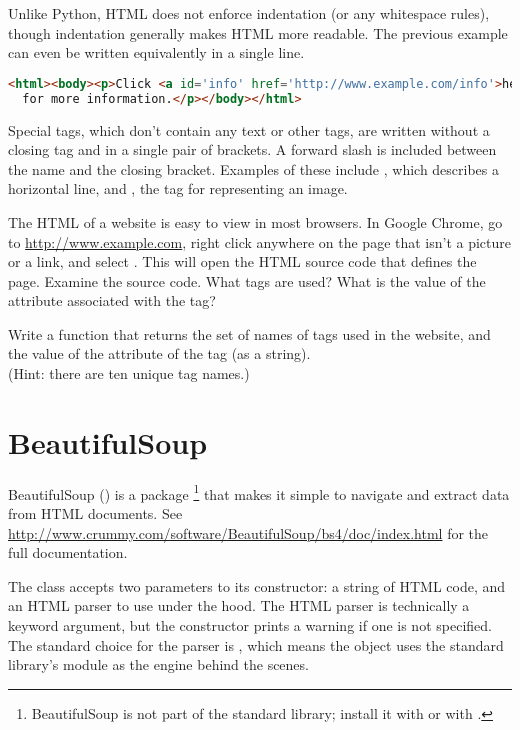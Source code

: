Unlike Python, HTML does not enforce indentation (or any whitespace rules), though indentation generally makes HTML more readable.
The previous example can even be written equivalently in a single line.

\begin{lstlisting}[language=HTML]
<html><body><p>Click <a id='info' href='http://www.example.com/info'>here</a>
  for more information.</p></body></html>
\end{lstlisting}

Special tags, which don't contain any text or other tags, are written without a closing tag and in a single pair of brackets.
A forward slash is included between the name and the closing bracket.
Examples of these include , which describes a horizontal line, and , the tag for representing an image.

\begin{problem} %
The HTML of a website is easy to view in most browsers.
In Google Chrome, go to \url{http://www.example.com}, right click anywhere on the page that isn't a picture or a link, and select .
This will open the HTML source code that defines the page.
Examine the source code.
What tags are used?
What is the value of the  attribute associated with the  tag?

Write a function that returns the set of names of tags used in the website, and the value of the  attribute of the  tag (as a string).
\\(Hint: there are ten unique tag names.)
\label{prob:look-at-example.com}
\end{problem}

\section*{BeautifulSoup} %

BeautifulSoup () is a package%
\footnote{BeautifulSoup is not part of the standard library; install it with  or with .} that makes it simple to navigate and extract data from HTML documents.
See \url{http://www.crummy.com/software/BeautifulSoup/bs4/doc/index.html} for the full documentation.

The  class accepts two parameters to its constructor: a string of HTML code, and an HTML parser to use under the hood.
The HTML parser is technically a keyword argument, but the constructor prints a warning if one is not specified.
The standard choice for the parser is , which means the object uses the standard library's  module as the engine behind the scenes.

